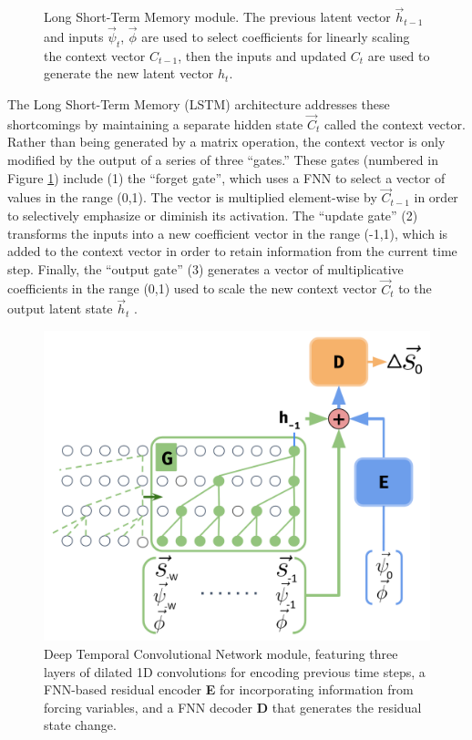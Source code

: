 \documentclass[11pt]{article}
\begin{document}
\begin{multicols}{2}
\begin{figure}[H]
        \caption{Long Short-Term Memory module. The previous latent vector $\vec{h}_{t-1}$ and inputs $\vec{\psi}_t$, $\vec{\phi}$ are used to select coefficients for linearly scaling the context vector $C_{t-1}$, then the inputs and updated $C_t$ are used to generate the new latent vector $h_t$.}
        \label{lstm}
    \end{figure}

    The Long Short-Term Memory (LSTM) architecture addresses these shortcomings by maintaining a separate hidden state $\vec{C}_t$ called the context vector. Rather than being generated by a matrix operation, the context vector is only modified by the output of a series of three ``gates.'' These gates (numbered in Figure \ref{lstm})  include (1) the ``forget gate'', which uses a FNN to select a vector of values in the range (0,1). The vector is multiplied element-wise by $\vec{C}_{t-1}$ in order to selectively emphasize or diminish its activation. The ``update gate'' (2) transforms the inputs into a new coefficient vector in the range (-1,1), which is added to the context vector in order to retain information from the current time step. Finally, the ``output gate'' (3) generates a vector of multiplicative coefficients in the range (0,1) used to scale the new context vector $\vec{C}_t$ to the output latent state $\vec{h}_t$ \cite{hochreiter_long_1997}.

    \begin{figure}[H]
        \centering

        \includegraphics[width=.95\linewidth]{figs/deeptcn.png}

        \caption{Deep Temporal Convolutional Network module, featuring three layers of dilated 1D convolutions for encoding previous time steps, a FNN-based residual encoder \textbf{E} for incorporating information from forcing variables, and a FNN decoder \textbf{D} that generates the residual state change.}
        \label{deeptcn}
    \end{figure}


\end{multicols}
\end{document}

